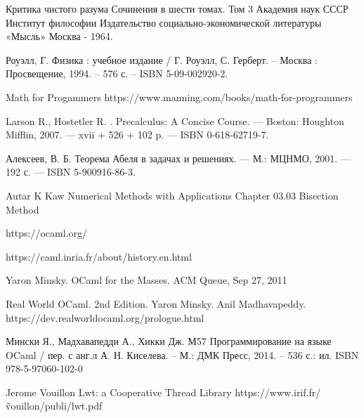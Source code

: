 \begingroup
\renewcommand{\section}[2]{\Anonchapter{Список использованных источников}}
\begin{thebibliography}{00}

    Критика чистого разума
    Сочинения в шести томах.
    Том 3
    Академия наук СССР
    Институт философии
    Издательство социально-экономической литературы
    «Мысль»
    Москва - 1964. \TODO

    Роуэлл, Г. Физика : учебное издание / Г. Роуэлл, С. Герберт. -- Москва : Просвещение, 1994. -- 576 с. -- ISBN 5-09-002920-2.

    Math for Progammers \TODO
    https://www.manning.com/books/math-for-programmers

    Larson R., Hostetler R. . Precalculus: A Concise Course. — Boston:
    Houghton Mifflin, 2007. — xvii + 526 + 102 p. — ISBN 0-618-62719-7. \TODO

    Алексеев, В. Б. Теорема Абеля в задачах и решениях. — М.: МЦНМО, 2001. — 192 с. — ISBN 5-900916-86-3. \TODO

    \TODO Autar K Kaw Numerical Methods with Applications Chapter 03.03 Bisection Method

    https://ocaml.org/ \TODO

    https://caml.inria.fr/about/history.en.html \TODO

    Yaron Minsky. OCaml for the Masses. ACM Queue, Sep 27, 2011 \TODO

    Real World OCaml. 2nd Edition. Yaron Minsky. Anil Madhavapeddy.
    https://dev.realworldocaml.org/prologue.html \TODO

    Мински Я., Мадхавапедди А., Хикки Дж. 
    М57 Программирование на языке OCaml / пер. с анг.л А. Н. Киселева. – 
    М.: ДМК Пресс, 2014. – 536 с.: ил.
    ISBN 978-5-97060-102-0
    \TODO

    Jerome Vouillon Lwt: a Cooperative Thread Library \TODO
    https://www.irif.fr/\~vouillon/publi/lwt.pdf

\end{thebibliography}
\endgroup

\clearpage
